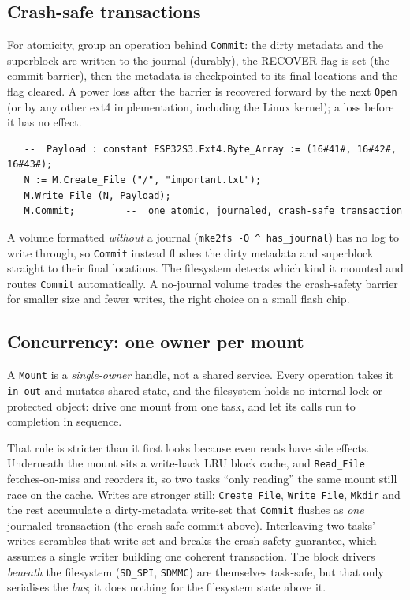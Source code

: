 \subsection{Crash-safe transactions}

For atomicity, group an operation behind \texttt{Commit}: the dirty metadata and
the superblock are written to the journal (durably), the RECOVER flag is set
(the commit barrier), then the metadata is checkpointed to its final locations
and the flag cleared. A power loss after the barrier is recovered forward by the
next \texttt{Open} (or by any other ext4 implementation, including the Linux
kernel); a loss before it has no effect.

\begin{lstlisting}
   --  Payload : constant ESP32S3.Ext4.Byte_Array := (16#41#, 16#42#, 16#43#);
   N := M.Create_File ("/", "important.txt");
   M.Write_File (N, Payload);
   M.Commit;         --  one atomic, journaled, crash-safe transaction
\end{lstlisting}

A volume formatted \emph{without} a journal (\texttt{mke2fs -O \textasciicircum
has\_journal}) has no log to write through, so \texttt{Commit} instead flushes the
dirty metadata and superblock straight to their final locations. The filesystem
detects which kind it mounted and routes \texttt{Commit} automatically. A
no-journal volume trades the crash-safety barrier for smaller size and fewer
writes, the right choice on a small flash chip.

\subsection{Concurrency: one owner per mount}

A \texttt{Mount} is a \emph{single-owner} handle, not a shared service. Every
operation takes it \texttt{in out} and mutates shared state, and the filesystem
holds no internal lock or protected object: drive one mount from one task, and let
its calls run to completion in sequence.

That rule is stricter than it first looks because even reads have side effects.
Underneath the mount sits a write-back LRU block cache, and \texttt{Read\_File}
fetches-on-miss and reorders it, so two tasks ``only reading'' the same mount
still race on the cache. Writes are stronger still: \texttt{Create\_File},
\texttt{Write\_File}, \texttt{Mkdir} and the rest accumulate a dirty-metadata
write-set that \texttt{Commit} flushes as \emph{one} journaled transaction (the
crash-safe commit above). Interleaving two tasks' writes scrambles that write-set
and breaks the crash-safety guarantee, which assumes a single writer building one
coherent transaction. The block drivers \emph{beneath} the filesystem
(\texttt{SD\_SPI}, \texttt{SDMMC}) are themselves task-safe, but that only
serialises the \emph{bus}; it does nothing for the filesystem state above it.

